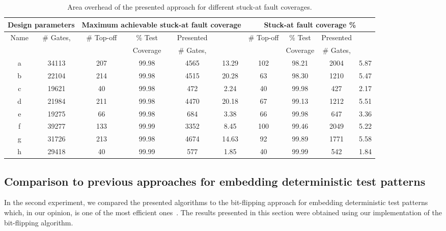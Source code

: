 \documentclass[10pt,conference]{IEEEtran}
\begin{document}
\begin{table*}[th]\centering\footnotesize
\begin{tabular}{|c|c||c|c|c|c||c|c|c|c|} \hline 
\multicolumn{2}{|c|}{Design parameters}  & \multicolumn{4}{|c|}{Maximum achievable stuck-at fault coverage} & \multicolumn{4}{|c|}{Stuck-at fault coverage \%} \\ \hline
\multirow{2}{*}{Name}	& \multirow{2}{*}{\# Gates, } &  \multirow{2}{*}{\# Top-off} & \% Test &  Presented &   \multirow{2}{*}{} &  \multirow{2}{*}{\# Top-off} & \% Test &  Presented &   \multirow{2}{*}{} \\
	&               &       &  Coverage  & \# Gates,  & &  & Coverage  & \# Gates,  &   \\ \hline
a	& 34113 & 207 & 99.98 & 4565 & 13.29 & 102	& 98.21 & 2004 & 5.87 \\
b	& 22104	& 214	& 99.98	& 4515	& 20.28	& 63 & 98.30	& 1210	& 5.47	\\
c	& 19621 & 40 & 99.98	& 472 & 2.24	& 40 & 99.98 &	427	& 2.17	\\
d	& 21984	& 211	& 99.98	& 4470 & 20.18 & 67	& 99.13 & 1212 & 5.51 \\
e	& 19275 & 66	& 99.98	& 684 & 3.38	& 66	& 99.98 & 647 & 3.36		\\
f	& 39277 & 133 & 99.99 & 3352 & 8.45 & 100	& 99.46 & 2049 & 5.22 \\
g	& 31726 & 213 & 99.98 & 4674 & 14.63 & 92	& 99.89 & 1771 & 5.58 \\
h	& 29418	& 40 &	99.99	& 577 & 1.85	& 40	& 99.99 & 542 & 1.84	\\ \hline
\end{tabular}
\caption{Area overhead of the presented approach for different stuck-at fault coverages.}
\label{ta3}
\end{table*}





\subsection{Comparison to previous approaches for embedding deterministic test patterns}

In the second experiment, we compared the presented algorithms to the bit-flipping
approach for embedding deterministic test patterns which, in our 
opinion, is one of the most efficient ones~\cite{WuK96}. 
The results presented in this section were obtained using our implementation of 
the bit-flipping algorithm. 
 
\end{document}
